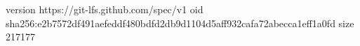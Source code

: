 version https://git-lfs.github.com/spec/v1
oid sha256:e2b7572df491aefeddf480bdfd2db9d1104d5aff932cafa72abecca1eff1a0fd
size 217177
